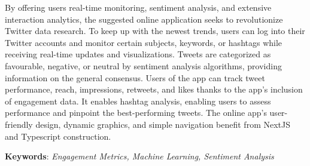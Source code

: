 \documentclass[a4paper,12pt]{article}
\begin{document}
								
		By offering users real-time monitoring, sentiment analysis, and extensive interaction analytics, the suggested online application seeks to revolutionize Twitter data research. To keep up with the newest trends, users can log into their Twitter accounts and monitor certain subjects, keywords, or hashtags while receiving real-time updates and visualizations. Tweets are categorized as favourable, negative, or neutral by sentiment analysis algorithms, providing information on the general consensus. Users of the app can track tweet performance, reach, impressions, retweets, and likes thanks to the app's inclusion of engagement data. It enables hashtag analysis, enabling users to assess performance and pinpoint the best-performing tweets. The online app's user-friendly design, dynamic graphics, and simple navigation benefit from NextJS and Typescript construction.
								
		\vspace{6pt}
		\noindent\textbf{Keywords}: \emph{Engagement Metrics, Machine Learning, Sentiment Analysis }
								


		\titleformat{\subsection}[hang]{\normalfont}{\thesubsection}{1em}{}
								
		\titlespacing{\subsection}{1.5em}{0.5em}{0.5em}


\titleformat{\subsubsection}[hang]{\normalfont}{\thesubsubsection}{1em}{}

\titlespacing{\subsubsection}{3.5em}{0.5em}{0.5em}










  
\end{document}
